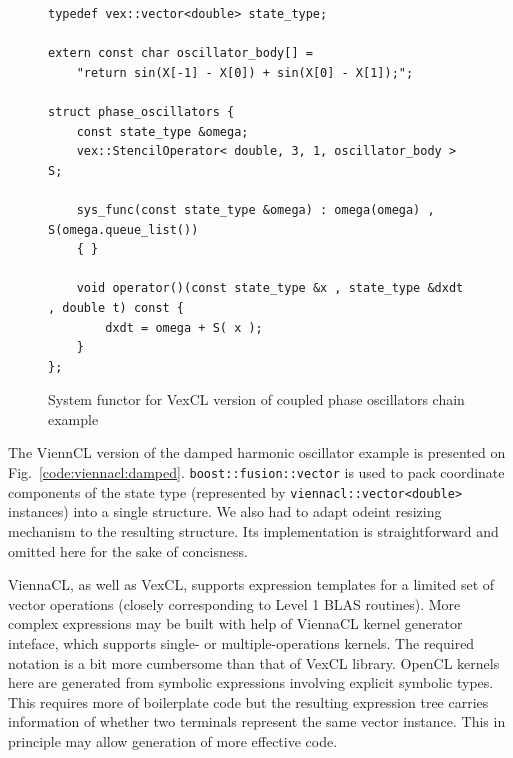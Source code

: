 \documentclass[1p]{elsarticle}
\newcommand{\code}[1]{\lstinline|#1|}
\newcommand{\figref}[1]{Fig.~\ref{#1}}
\begin{document}
\begin{figure}[p]
\begin{lstlisting}
typedef vex::vector<double> state_type;

extern const char oscillator_body[] =
    "return sin(X[-1] - X[0]) + sin(X[0] - X[1]);";

struct phase_oscillators {
    const state_type &omega;
    vex::StencilOperator< double, 3, 1, oscillator_body > S;

    sys_func(const state_type &omega) : omega(omega) , S(omega.queue_list())
    { }

    void operator()(const state_type &x , state_type &dxdt , double t) const {
        dxdt = omega + S( x );
    }
};
\end{lstlisting}
\caption{System functor for VexCL version of coupled phase oscillators chain
example}
\label{code:vexcl:phase}
\end{figure}

The ViennCL version of the damped harmonic oscillator example is presented on
\figref{code:viennacl:damped}. \code{boost::fusion::vector} is used to pack
coordinate components of the state type (represented by
\code{viennacl::vector<double>} instances) into a single structure. We also had
to adapt odeint resizing mechanism to the resulting structure. Its
implementation is straightforward and omitted here for the sake of concisness.

ViennaCL, as well as VexCL, supports expression templates for a limited set of
vector operations (closely corresponding to Level 1 BLAS routines). More
complex expressions may be built with help of ViennaCL kernel generator
inteface, which supports single- or multiple-operations kernels. The required
notation is a bit more cumbersome than that of VexCL library. OpenCL kernels
here are generated from symbolic expressions involving explicit symbolic types.
This requires more of boilerplate code but the resulting expression tree
carries information of whether two terminals represent the same vector
instance. This in principle may allow generation of more effective code.
\end{document}
